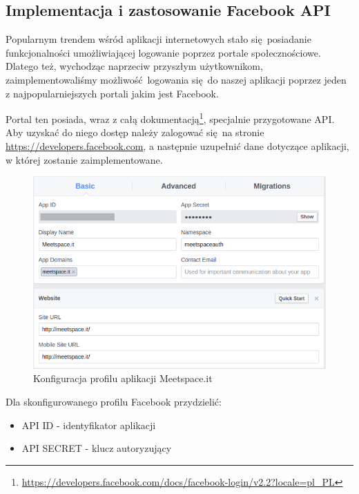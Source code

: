   

\subsection{Implementacja i zastosowanie Facebook API}
Popularnym trendem wśród aplikacji internetowych stało się posiadanie funkcjonalności umożliwiającej logowanie poprzez portale społecznościowe. Dlatego też, wychodząc naprzeciw przyszłym użytkownikom, zaimplementowaliśmy możliwość logowania się do naszej aplikacji poprzez jeden z najpopularniejszych portali jakim jest Facebook.

Portal ten posiada, wraz z całą dokumentacją\footnote{\url{https://developers.facebook.com/docs/facebook-login/v2.2?locale=pl\_PL}}, specjalnie przygotowane API. Aby uzyskać do niego dostęp należy zalogować się na stronie \url{https://developers.facebook.com}, a następnie uzupełnić dane dotyczące aplikacji, w której zostanie zaimplementowane. \\

\begin{figure}[h]
  \centering
    \includegraphics[scale=0.65]{images/fb_settings.png}
  \caption{Konfiguracja profilu aplikacji Meetspace.it}
\end{figure}

\clearpage

Dla skonfigurowanego profilu Facebook przydzielić:

\begin{itemize}
  \item API ID - identyfikator aplikacji
  \item API SECRET - klucz autoryzujący
\end{itemize}

